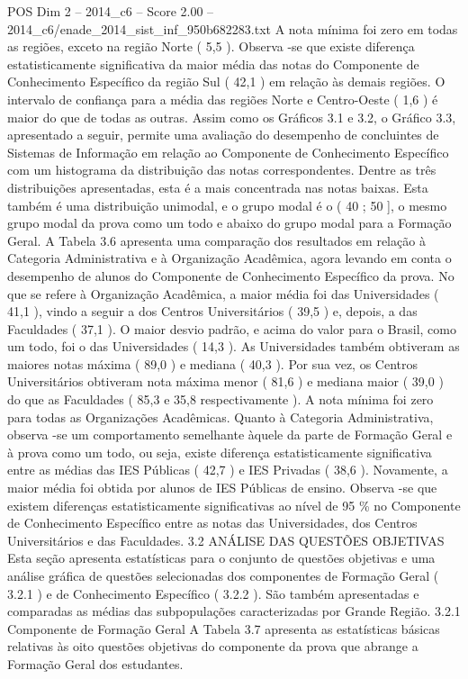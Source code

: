 \begin{textsample}{POS Dim 2 – 2014\_c6 – Score 2.00 – 2014\_c6/enade\_2014\_sist\_inf\_950b682283.txt}
A nota mínima foi zero em todas as regiões, exceto na região Norte ( 5,5 ).
Observa -se que existe diferença estatisticamente significativa da maior média das notas do Componente de Conhecimento Específico da região Sul ( 42,1 ) em relação às demais regiões.
O intervalo de confiança para a média das regiões Norte e Centro-Oeste ( 1,6 ) é maior do que de todas as outras.
Assim como os Gráficos 3.1 e 3.2, o Gráfico 3.3, apresentado a seguir, permite uma avaliação do desempenho de concluintes de Sistemas de Informação em relação ao Componente de Conhecimento Específico com um histograma da distribuição das notas correspondentes.
Dentre as três distribuições apresentadas, esta é a mais concentrada nas notas baixas.
Esta também é uma distribuição unimodal, e o grupo modal é o ( 40 ; 50 ], o mesmo grupo modal da prova como um todo e abaixo do grupo modal para a Formação Geral.
A Tabela 3.6 apresenta uma comparação dos resultados em relação à Categoria Administrativa e à Organização Acadêmica, agora levando em conta o desempenho de alunos do Componente de Conhecimento Específico da prova.
No que se refere à Organização Acadêmica, a maior média foi das Universidades ( 41,1 ), vindo a seguir a dos Centros Universitários ( 39,5 ) e, depois, a das Faculdades ( 37,1 ).
O maior desvio padrão, e acima do valor para o Brasil, como um todo, foi o das Universidades ( 14,3 ).
As Universidades também obtiveram as maiores notas máxima ( 89,0 ) e mediana ( 40,3 ).
Por sua vez, os Centros Universitários obtiveram nota máxima menor ( 81,6 ) e mediana maior ( 39,0 ) do que as Faculdades ( 85,3 e 35,8 respectivamente ).
A nota mínima foi zero para todas as Organizações Acadêmicas.
Quanto à Categoria Administrativa, observa -se um comportamento semelhante àquele da parte de Formação Geral e à prova como um todo, ou seja, existe diferença estatisticamente significativa entre as médias das IES Públicas ( 42,7 ) e IES Privadas ( 38,6 ).
Novamente, a maior média foi obtida por alunos de IES Públicas de ensino.
Observa -se que existem diferenças estatisticamente significativas ao nível de 95 \% no Componente de Conhecimento Específico entre as notas das Universidades, dos Centros Universitários e das Faculdades. 3.2 ANÁLISE DAS QUESTÕES OBJETIVAS Esta seção apresenta estatísticas para o conjunto de questões objetivas e uma análise gráfica de questões selecionadas dos componentes de Formação Geral ( 3.2.1 ) e de Conhecimento Específico ( 3.2.2 ).
São também apresentadas e comparadas as médias das subpopulações caracterizadas por Grande Região. 3.2.1 Componente de Formação Geral A Tabela 3.7 apresenta as estatísticas básicas relativas às oito questões objetivas do componente da prova que abrange a Formação Geral dos estudantes.

\end{textsample}
